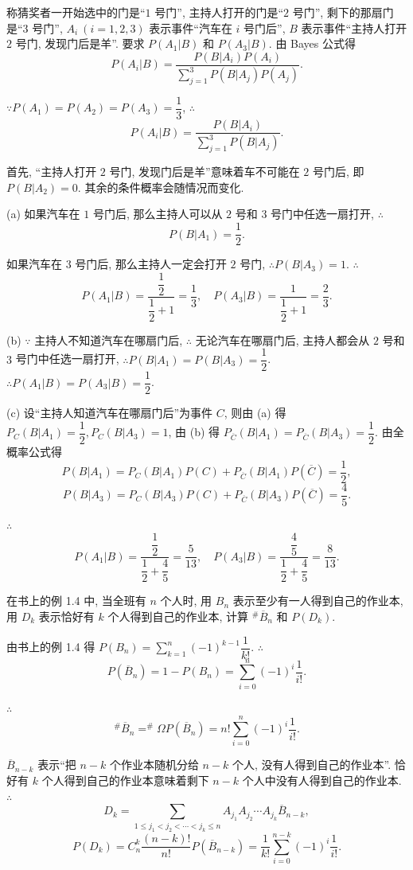 \documentclass[color=black,device=normal,lang=cn]{elegantnote}
\numberwithin{equation}{section}
\theoremstyle{plain}
\numberwithin{exercise}{exsection}
\begin{document}
\begin{solution}
    称猜奖者一开始选中的门是``$1$ 号门'', 主持人打开的门是``$2$ 号门'', 剩下的那扇门是``$3$ 号门'', $A_i\ (i=1,2,3)$ 表示事件``汽车在 $i$ 号门后'', $B$ 表示事件``主持人打开 $2$ 号门, 发现门后是羊''. 要求 $P(A_1|B)$ 和 $P(A_3|B)$. 由 Bayes 公式得
    \[P(A_i|B)=\dfrac{P(B|A_i)P(A_i)}{\sum\limits_{j=1}^3P(B|A_j)P(A_j)}.\]

    $\because P(A_1)=P(A_2)=P(A_3)=\dfrac{1}{3}$, $\therefore$
    \[P(A_i|B)=\dfrac{P(B|A_i)}{\sum\limits_{j=1}^3P(B|A_j)}.\]

    首先, ``主持人打开 $2$ 号门, 发现门后是羊''意味着车不可能在 $2$ 号门后, 即 $P(B|A_2)=0$. 其余的条件概率会随情况而变化.

    (a) 如果汽车在 $1$ 号门后, 那么主持人可以从 $2$ 号和 $3$ 号门中任选一扇打开, $\therefore$
    \[P(B|A_1)=\dfrac{1}{2}.\]

    如果汽车在 $3$ 号门后, 那么主持人一定会打开 $2$ 号门, $\therefore P(B|A_3)=1$. $\therefore$
    \[P(A_1|B)=\dfrac{\dfrac{1}{2}}{\dfrac{1}{2}+1}=\dfrac{1}{3},\quad P(A_3|B)=\dfrac{1}{\dfrac{1}{2}+1}=\dfrac{2}{3}.\]

    (b) $\because$ 主持人不知道汽车在哪扇门后, $\therefore$ 无论汽车在哪扇门后, 主持人都会从 $2$ 号和 $3$ 号门中任选一扇打开, $\therefore P(B|A_1)=P(B|A_3)=\dfrac{1}{2}$. $\therefore P(A_1|B)=P(A_3|B)=\dfrac{1}{2}$.

    (c) 设``主持人知道汽车在哪扇门后''为事件 $C$, 则由 (a) 得 $P_C(B|A_1)=\dfrac{1}{2},P_C(B|A_3)=1$, 由 (b) 得 $P_{\overline{C}}(B|A_1)=P_{\overline{C}}(B|A_3)=\dfrac{1}{2}$. 由全概率公式得
    \[P(B|A_1)=P_C(B|A_1)P(C)+P_{\overline{C}}(B|A_1)P(\overline{C})=\dfrac{1}{2},\]
    \[P(B|A_3)=P_C(B|A_3)P(C)+P_{\overline{C}}(B|A_3)P(\overline{C})=\dfrac{4}{5}.\]

    $\therefore$
    \[P(A_1|B)=\dfrac{\dfrac{1}{2}}{\dfrac{1}{2}+\dfrac{4}{5}}=\dfrac{5}{13},\quad P(A_3|B)=\dfrac{\dfrac{4}{5}}{\dfrac{1}{2}+\dfrac{4}{5}}=\dfrac{8}{13}.\]
\end{solution}
\begin{exercise}
    在书上的例 1.4 中, 当全班有 $n$ 个人时, 用 $B_n$ 表示至少有一人得到自己的作业本, 用 $D_k$ 表示恰好有 $k$ 个人得到自己的作业本, 计算 $^\#\overline{B}_n$ 和 $P(D_k)$.
\end{exercise}
\begin{solution}
    由书上的例 1.4 得 $P(B_n)=\sum\limits_{k=1}^n(-1)^{k-1}\dfrac{1}{k!}$. $\therefore$
    \[P(\overline{B}_n)=1-P(B_n)=\sum\limits_{i=0}^n(-1)^{i}\dfrac{1}{i!}.\]

    $\therefore$
    \[^\#\overline{B}_n=^\#\Omega P(\overline{B}_n)=n!\sum\limits_{i=0}^n(-1)^{i}\dfrac{1}{i!}.\]
    
    $\overline{B}_{n-k}$ 表示``把 $n-k$ 个作业本随机分给 $n-k$ 个人, 没有人得到自己的作业本''. 恰好有 $k$ 个人得到自己的作业本意味着剩下 $n-k$ 个人中没有人得到自己的作业本. $\therefore$
    \[D_k=\sum\limits_{1\leq j_1<j_2<\cdots<j_k\leq n}A_{j_1}A_{j_2}\cdots A_{j_k}\overline{B}_{n-k},\]
    \[P(D_k)=C_n^k\dfrac{(n-k)!}{n!}P(\overline{B}_{n-k})=\dfrac{1}{k!}\sum\limits_{i=0}^{n-k}(-1)^{i}\dfrac{1}{i!}.\]
\end{solution}
\end{document}
